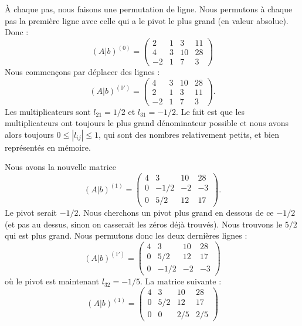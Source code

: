 À chaque pas, nous faisons une permutation de ligne. Nous permutons à chaque pas la première ligne avec celle qui a le pivot le plus grand (en valeur absolue). Donc :
\begin{equation}
    (A|b)^{(0)}=\begin{pmatrix}
         2   &   1    &   3    &   11    \\
         4   &   3    &   10    &   28    \\ 
         -2   &   1    &   7    &   3
     \end{pmatrix}
\end{equation}
Nous commençons par déplacer des lignes :
\begin{equation}
    (A|b)^{(0')}=\begin{pmatrix}
         4   &   3    &   10    &   28    \\ 
         2   &   1    &   3    &   11    \\
         -2   &   1    &   7    &   3
     \end{pmatrix}.
\end{equation}
Les multiplicateurs sont \( l_{21}=1/2\) et \( l_{31}=-1/2\). Le fait est que les multiplicateurs ont toujours le plus grand dénominateur possible et nous avons alors toujours \( 0\leq | l_{ij} |\leq 1\), qui sont des nombres relativement petits, et bien représentés en mémoire.

Nous avons la nouvelle matrice
\begin{equation}
    (A|b)^{(1)}=\begin{pmatrix}
         4   &   3    &   10    &   28    \\ 
         0   &   -1/2    &   -2    &   -3    \\
         0   &   5/2    &   12    &   17
     \end{pmatrix}.
\end{equation}
Le pivot serait \( -1/2\). Nous cherchons un pivot plus grand en dessous de ce \( -1/2\) (et pas au dessus, sinon on casserait les zéros déjà trouvés). 
Nous trouvons le \( 5/2\) qui est plus grand. Nous permutons donc les deux dernières lignes :
\begin{equation}
    (A|b)^{(1')}=\begin{pmatrix}
         4   &   3    &   10    &   28    \\ 
         0   &   5/2    &   12    &   17\\
         0   &   -1/2    &   -2    &   -3   
     \end{pmatrix}
\end{equation}
où le pivot est maintenant \( l_{32}=-1/5\). La matrice suivante :
\begin{equation}
    (A|b)^{(1)}=\begin{pmatrix}
         4   &   3    &   10    &   28    \\ 
         0   &   5/2    &   12    &   17\\
         0   &   0   &   2/5    &   2/5   
     \end{pmatrix}
\end{equation}

